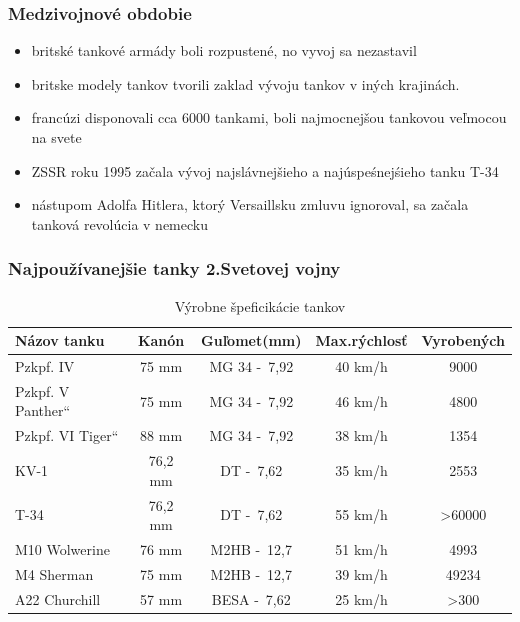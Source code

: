 \documentclass{beamer}
\providecommand{\uv}[1]{\quotedblbase #1\textquotedblleft}
\begin{document}
	
	
	\begin{frame}
		\frametitle{Medzivojnové obdobie}
		\begin{itemize}
			\item britské tankové armády boli rozpustené, no vyvoj sa nezastavil
			\item britske modely tankov tvorili zaklad vývoju tankov v iných krajinách.
			\item francúzi disponovali cca 6000 tankami, boli najmocnejšou tankovou veľmocou na svete
			\item ZSSR roku 1995 začala vývoj najslávnejšieho a najúspeśnejśieho tanku T-34
			\item nástupom Adolfa Hitlera, ktorý Versaillsku zmluvu ignoroval, sa začala tanková revolúcia v nemecku
		\end{itemize}
	\end{frame}
	
	
	
	\begin{frame}
		\begin{table}
			\frametitle{Najpoužívanejšie tanky 2.Svetovej vojny}
			\small
			\begin{tabular}{l | c | c | c | c }
				Názov tanku 			& Kanón	& Guľomet(mm) 	& Max.rýchlosť 	& Vyrobených	\\
				\hline \hline
				Pzkpf. IV 				& 75 mm		& MG 34 -\ 7,92 & 40 km/h	& 9000		\\ 
				Pzkpf. V \uv{Panther}	& 75 mm		& MG 34 -\ 7,92 & 46 km/h	& 4800		\\
				Pzkpf. VI \uv{Tiger} 	& 88 mm		& MG 34 -\ 7,92 & 38 km/h	& 1354		\\
				\hline	
				KV-1 					& 76,2 mm	& DT -\ 7,62 	& 35 km/h	& 2553		\\
				T-34 					& 76,2 mm	& DT -\ 7,62 	& 55 km/h	& >60000	\\
				\hline
				M10 Wolwerine			& 76 mm		& M2HB -\ 12,7 	& 51 km/h	& 4993	\\
				M4 Sherman				& 75 mm		& M2HB -\ 12,7 	& 39 km/h	& 49234		\\
				\hline
				A22 Churchill			& 57 mm		& BESA -\ 7,62 	& 25 km/h	& >300		\\
			\end{tabular}
			\caption{Výrobne špeficikácie tankov}
		\end{table}
	\end{frame}
	
	
	
\end{document}
